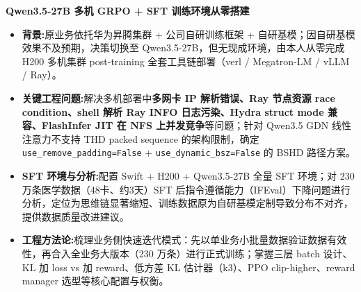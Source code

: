 \documentclass[11pt,a4paper]{article}
\begin{document}

\textbf{Qwen3.5-27B 多机 GRPO + SFT 训练环境从零搭建}
\begin{itemize}
    \item \textbf{背景:}原业务依托华为昇腾集群 + 公司自研训练框架 + 自研基模；因自研基模效果不及预期，决策切换至 Qwen3.5-27B，但无现成环境，由本人从零完成 H200 多机集群 post-training 全套工具链部署（verl / Megatron-LM / vLLM / Ray）。
    \item \textbf{关键工程问题:}解决多机部署中\textbf{多网卡 IP 解析错误、Ray 节点资源 race condition、shell 解析 Ray INFO 日志污染、Hydra struct mode 兼容、FlashInfer JIT 在 NFS 上并发竞争}等问题；针对 Qwen3.5 GDN 线性注意力不支持 THD packed sequence 的架构限制，确定 \texttt{use\_remove\_padding=False} + \texttt{use\_dynamic\_bsz=False} 的 BSHD 路径方案。
    \item \textbf{SFT 环境与分析:}配置 Swift + H200 + Qwen3.5-27B 全量 SFT 环境；对 230 万条医学数据（48卡、约3天）SFT 后指令遵循能力（IFEval）下降问题进行分析，定位为思维链显著缩短、训练数据原为自研基模定制导致分布不对齐，提供数据质量改进建议。
    \item \textbf{工程方法论:}梳理业务侧快速迭代模式：先以单业务小批量数据验证数据有效性，再合入全业务大版本（230 万条）进行正式训练；掌握三层 batch 设计、KL 加 loss vs 加 reward、低方差 KL 估计器（k3）、PPO clip-higher、reward manager 选型等核心配置与权衡。
\end{itemize}
\end{document}
